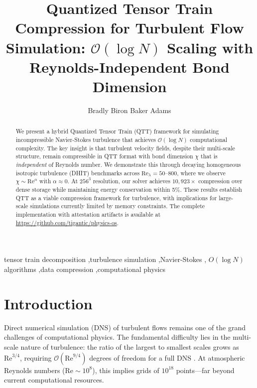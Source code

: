 \documentclass[preprint,12pt,authoryear]{elsarticle}
\newcommand{\bigO}{\mathcal{O}}
\theoremstyle{definition}
\begin{document}
\begin{frontmatter}

\title{Quantized Tensor Train Compression for Turbulent Flow Simulation:
$\bigO(\log N)$ Scaling with Reynolds-Independent Bond Dimension}

\author[tigantic]{Bradly Biron Baker Adams}
\address[tigantic]{Tigantic Holdings LLC}

\begin{abstract}
We present a hybrid Quantized Tensor Train (QTT) framework for simulating incompressible Navier-Stokes turbulence that achieves $\bigO(\log N)$ computational complexity. 
The key insight is that turbulent velocity fields, despite their multi-scale structure, remain compressible in QTT format with bond dimension $\chi$ that is \emph{independent} of Reynolds number.
We demonstrate this through decaying homogeneous isotropic turbulence (DHIT) benchmarks across $\mathrm{Re}_\lambda = 50$--$800$, where we observe $\chi \sim \mathrm{Re}^\alpha$ with $\alpha \approx 0$.
At $256^3$ resolution, our solver achieves $10{,}923\times$ compression over dense storage while maintaining energy conservation within 5\%.
These results establish QTT as a viable compression framework for turbulence, with implications for large-scale simulations currently limited by memory constraints.
The complete implementation with attestation artifacts is available at \url{https://github.com/tigantic/physics-os}.
\end{abstract}

\begin{keyword}
tensor train decomposition \sep turbulence simulation \sep Navier-Stokes \sep
$O(\log N)$ algorithms \sep data compression \sep computational physics
\end{keyword}

\end{frontmatter}

\linenumbers

\section{Introduction}
\label{sec:intro}

Direct numerical simulation (DNS) of turbulent flows remains one of the grand challenges of computational physics.
The fundamental difficulty lies in the multi-scale nature of turbulence: the ratio of the largest to smallest scales grows as $\mathrm{Re}^{3/4}$, requiring $\bigO(\mathrm{Re}^{9/4})$ degrees of freedom for a full DNS \citep{pope2000turbulent}.
At atmospheric Reynolds numbers ($\mathrm{Re} \sim 10^8$), this implies grids of $10^{18}$ points---far beyond current computational resources.
\end{document}
